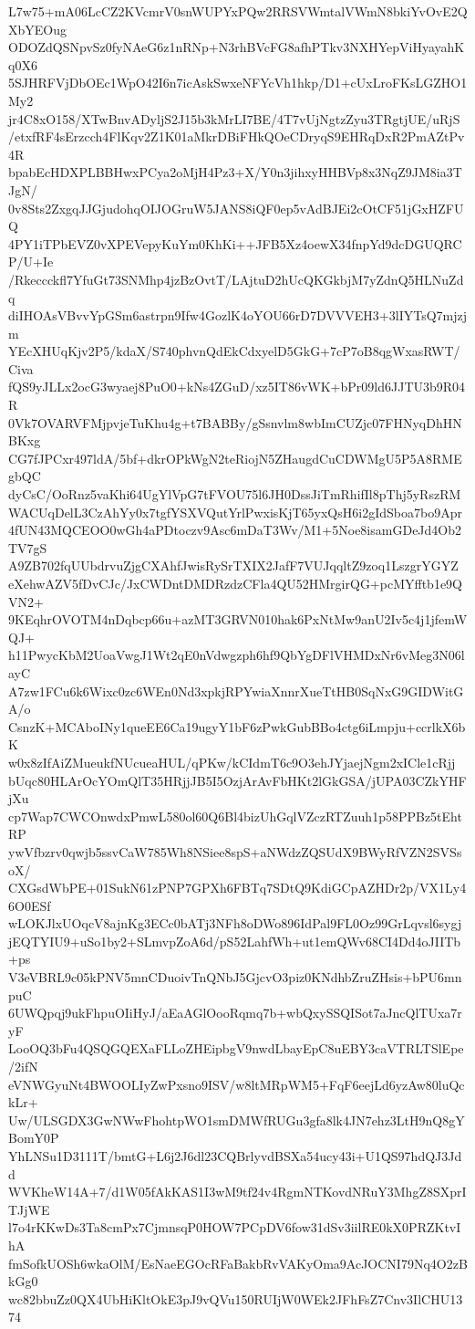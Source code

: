 L7w75+mA06LcCZ2KVcmrV0snWUPYxPQw2RRSVWmtalVWmN8bkiYvOvE2QXbYEOug
ODOZdQSNpvSz0fyNAeG6z1nRNp+N3rhBVcFG8afhPTkv3NXHYepViHyayahKq0X6
5SJHRFVjDbOEc1WpO42I6n7icAskSwxeNFYcVh1hkp/D1+cUxLroFKsLGZHO1My2
jr4C8xO158/XTwBnvADyljS2J15b3kMrLI7BE/4T7vUjNgtzZyu3TRgtjUE/uRjS
/etxfRF4sErzcch4FlKqv2Z1K01aMkrDBiFHkQOeCDryqS9EHRqDxR2PmAZtPv4R
bpabEcHDXPLBBHwxPCya2oMjH4Pz3+X/Y0n3jihxyHHBVp8x3NqZ9JM8ia3TJgN/
0v8Sts2ZxgqJJGjudohqOIJOGruW5JANS8iQF0ep5vAdBJEi2cOtCF51jGxHZFUQ
4PY1iTPbEVZ0vXPEVepyKuYm0KhKi++JFB5Xz4oewX34fnpYd9dcDGUQRCP/U+Ie
/Rkeccckfl7YfuGt73SNMhp4jzBzOvtT/LAjtuD2hUcQKGkbjM7yZdnQ5HLNuZdq
diIHOAsVBvvYpGSm6astrpn9Ifw4GozlK4oYOU66rD7DVVVEH3+3lIYTsQ7mjzjm
YEcXHUqKjv2P5/kdaX/S740phvnQdEkCdxyelD5GkG+7cP7oB8qgWxasRWT/Civa
fQS9yJLLx2ocG3wyaej8PuO0+kNs4ZGuD/xz5IT86vWK+bPr09ld6JJTU3b9R04R
0Vk7OVARVFMjpvjeTuKhu4g+t7BABBy/gSsnvlm8wbImCUZjc07FHNyqDhHNBKxg
CG7fJPCxr497ldA/5bf+dkrOPkWgN2teRiojN5ZHaugdCuCDWMgU5P5A8RMEgbQC
dyCsC/OoRnz5vaKhi64UgYlVpG7tFVOU75l6JH0DssJiTmRhifIl8pThj5yRszRM
WACUqDelL3CzAhYy0x7tgfYSXVQutYrlPwxisKjT65yxQsH6i2gIdSboa7bo9Apr
4fUN43MQCEOO0wGh4aPDtoczv9Asc6mDaT3Wv/M1+5Noe8isamGDeJd4Ob2TV7gS
A9ZB702fqUUbdrvuZjgCXAhfJwisRySrTXIX2JafF7VUJqqltZ9zoq1LszgrYGYZ
eXehwAZV5fDvCJc/JxCWDntDMDRzdzCFla4QU52HMrgirQG+pcMYfftb1e9QVN2+
9KEqhrOVOTM4nDqbcp66u+azMT3GRVN010hak6PxNtMw9anU2Iv5c4j1jfemWQJ+
h11PwycKbM2UoaVwgJ1Wt2qE0nVdwgzph6hf9QbYgDFlVHMDxNr6vMeg3N06layC
A7zw1FCu6k6Wixc0zc6WEn0Nd3xpkjRPYwiaXnnrXueTtHB0SqNxG9GIDWitGA/o
CsnzK+MCAboINy1queEE6Ca19ugyY1bF6zPwkGubBBo4ctg6iLmpju+ccrlkX6bK
w0x8zIfAiZMueukfNUcueaHUL/qPKw/kCIdmT6c9O3ehJYjaejNgm2xICle1cRjj
bUqc80HLArOcYOmQlT35HRjjJB5I5OzjArAvFbHKt2lGkGSA/jUPA03CZkYHFjXu
cp7Wap7CWCOnwdxPmwL580ol60Q6Bl4bizUhGqlVZczRTZuuh1p58PPBz5tEhtRP
ywVfbzrv0qwjb5ssvCaW785Wh8NSiee8spS+aNWdzZQSUdX9BWyRfVZN2SVSsoX/
CXGsdWbPE+01SukN61zPNP7GPXh6FBTq7SDtQ9KdiGCpAZHDr2p/VX1Ly46O0ESf
wLOKJlxUOqcV8ajnKg3ECc0bATj3NFh8oDWo896IdPal9FL0Oz99GrLqvsl6sygj
jEQTYIU9+uSo1by2+SLmvpZoA6d/pS52LahfWh+ut1emQWv68CI4Dd4oJIITb+ps
V3eVBRL9c05kPNV5mnCDuoivTnQNbJ5GjcvO3piz0KNdhbZruZHsis+bPU6mnpuC
6UWQpqj9ukFhpuOIiHyJ/aEaAGlOooRqmq7b+wbQxySSQISot7aJncQlTUxa7ryF
LooOQ3bFu4QSQGQEXaFLLoZHEipbgV9nwdLbayEpC8uEBY3caVTRLTSlEpe/2ifN
eVNWGyuNt4BWOOLIyZwPxsno9ISV/w8ltMRpWM5+FqF6eejLd6yzAw80luQckLr+
Uw/ULSGDX3GwNWwFhohtpWO1smDMWfRUGu3gfa8lk4JN7ehz3LtH9nQ8gYBomY0P
YhLNSu1D3111T/bmtG+L6j2J6dl23CQBrlyvdBSXa54ucy43i+U1QS97hdQJ3Jdd
WVKheW14A+7/d1W05fAkKAS1I3wM9tf24v4RgmNTKovdNRuY3MhgZ8SXprITJjWE
l7o4rKKwDs3Ta8cmPx7CjmnsqP0HOW7PCpDV6fow31dSv3iilRE0kX0PRZKtvIhA
fmSofkUOSh6wkaOlM/EsNaeEGOcRFaBakbRvVAKyOma9AcJOCNI79Nq4O2zBkGg0
wc82bbuZz0QX4UbHiKltOkE3pJ9vQVu150RUIjW0WEk2JFhFsZ7Cnv3IlCHU1374
